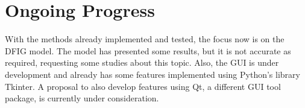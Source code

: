\section{Ongoing Progress}

With the methods already implemented and tested, the focus now is on the DFIG model. The model has presented some results, but it is not accurate as required, requesting some studies about this topic. Also, the GUI is under development and already has some features implemented using Python's library Tkinter. A proposal to also develop features using Qt, a different GUI tool package, is currently under consideration.